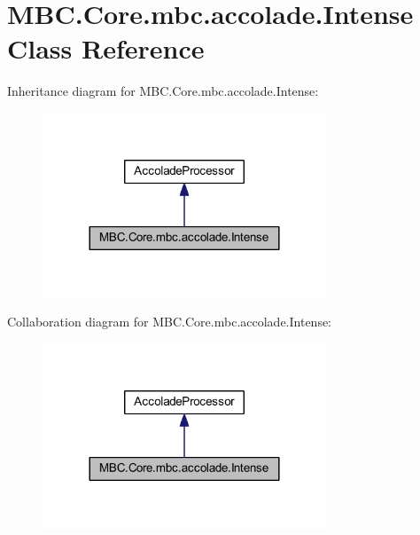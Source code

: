 \hypertarget{class_m_b_c_1_1_core_1_1mbc_1_1accolade_1_1_intense}{\section{M\-B\-C.\-Core.\-mbc.\-accolade.\-Intense Class Reference}
\label{class_m_b_c_1_1_core_1_1mbc_1_1accolade_1_1_intense}
}


Inheritance diagram for M\-B\-C.\-Core.\-mbc.\-accolade.\-Intense\-:
\nopagebreak
\begin{figure}[H]
\begin{center}
\leavevmode
\includegraphics[width=240pt]{class_m_b_c_1_1_core_1_1mbc_1_1accolade_1_1_intense__inherit__graph}
\end{center}
\end{figure}


Collaboration diagram for M\-B\-C.\-Core.\-mbc.\-accolade.\-Intense\-:
\nopagebreak
\begin{figure}[H]
\begin{center}
\leavevmode
\includegraphics[width=240pt]{class_m_b_c_1_1_core_1_1mbc_1_1accolade_1_1_intense__coll__graph}
\end{center}
\end{figure}
